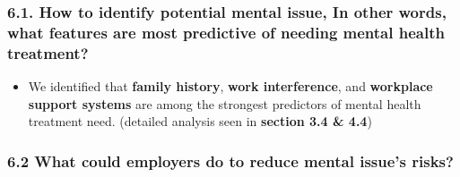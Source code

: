 \documentclass[
]{article}
\providecommand{\tightlist}{%
  \setlength{\itemsep}{0pt}\setlength{\parskip}{0pt}}
\begin{document}
\subsubsection{6.1. How to identify potential mental issue, In other
words, what features are most predictive of needing mental health
treatment?}\label{how-to-identify-potential-mental-issue-in-other-words-what-features-are-most-predictive-of-needing-mental-health-treatment}

\begin{itemize}
\tightlist
\item
  We identified that \textbf{family history}, \textbf{work
  interference}, and \textbf{workplace support systems} are among the
  strongest predictors of mental health treatment need. (detailed
  analysis seen in \textbf{section 3.4 \& 4.4})
\end{itemize}

\subsubsection{6.2 What could employers do to reduce mental issue's
risks?}\label{what-could-employers-do-to-reduce-mental-issues-risks}
\end{document}
